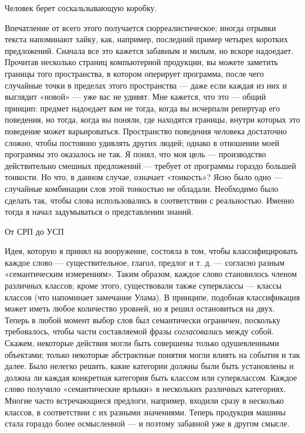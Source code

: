 \documentclass[../main.tex]{subfiles}
\begin{document}
Человек берет соскальзывающую коробку.

Впечатление от всего этого получается сюрреалистическое; иногда отрывки текста напоминают хайку, как, например, последний пример четырех коротких предложений. Сначала все это кажется забавным и милым, но вскоре надоедает. Прочитав несколько страниц компьютерной продукции, вы можете заметить границы того пространства, в котором оперирует программа, после чего случайные точки в пределах этого пространства --- даже если каждая из них и выглядит «новой» --- уже вас не удивят. Мне кажется, что это --- общий принцип: предмет надоедает вам не тогда, когда вы исчерпали репертуар его поведения, но тогда, когда вы поняли, где находятся границы, внутри которых это поведение может варьироваться. Пространство поведения человека достаточно сложно, чтобы постоянно удивлять других людей; однако в отношении моей программы это оказалось не так. Я понял, что моя цель --- производство действительно смешных предложений --- требует от программы гораздо большей тонкости. Но что, в данном случае, означает «тонкость»? Ясно было одно --- случайные комбинации слов этой тонкостью не обладали. Необходимо было сделать так, чтобы слова использовались в соответствии с реальностью. Именно тогда я начал задумываться о представлении знаний.

От СРП до УСП

Идея, которую я принял на вооружение, состояла в том, чтобы классифицировать каждое слово --- существительное, глагол, предлог и т. д. --- согласно разным «семантическим измерениям». Таким образом, каждое слово становилось членом различных классов; кроме этого, существовали также суперклассы --- классы классов (что напоминает замечание Улама). В принципе, подобная классификация может иметь любое количество уровней, но я решил остановиться на двух. Теперь в любой момент выбор слов был семантически ограничен, поскольку требовалось, чтобы части составляемой фразы \emph{согласовались} между собой. Скажем, некоторые действия могли быть совершены только одушевленными объектами; только некоторые абстрактные понятия могли влиять на события и так далее. Было нелегко решить, какие категории должны были быть установлены и должна ли каждая конкретная категория быть классом или суперклассом. Каждое слово получило «семантические ярлыки» в нескольких различных категориях. Многие часто встречающиеся предлоги, например, входили сразу в несколько классов, в соответствии с их разными значениями. Теперь продукция машины стала гораздо более осмысленной --- и поэтому забавной уже в другом смысле.
\end{document}
